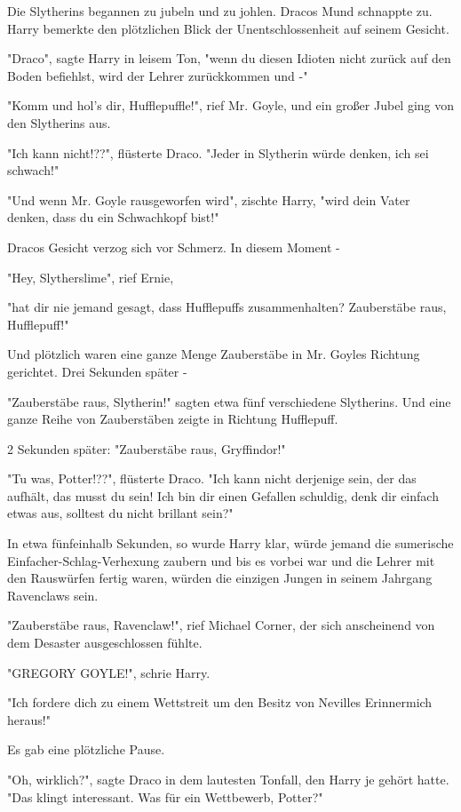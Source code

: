 {Die Slytherins begannen zu jubeln und zu johlen. Dracos Mund schnappte zu. Harry bemerkte den plötzlichen Blick der Unentschlossenheit auf seinem Gesicht.

"Draco", sagte Harry in leisem Ton, "wenn du diesen Idioten nicht zurück auf den Boden befiehlst, wird der Lehrer zurückkommen und -"

"Komm und hol's dir, Hufflepuffle!", rief Mr. Goyle, und ein großer Jubel ging von den Slytherins aus.

"Ich kann nicht!??", flüsterte Draco. "Jeder in Slytherin würde denken, ich sei schwach!"

"Und wenn Mr. Goyle rausgeworfen wird", zischte Harry, "wird dein Vater denken, dass du ein Schwachkopf bist!"

Dracos Gesicht verzog sich vor Schmerz. In diesem Moment -

"Hey, Slytherslime", rief Ernie,

"hat dir nie jemand gesagt, dass Hufflepuffs zusammenhalten? Zauberstäbe raus, Hufflepuff!"

Und plötzlich waren eine ganze Menge Zauberstäbe in Mr. Goyles Richtung gerichtet. Drei Sekunden später -

"Zauberstäbe raus, Slytherin!" sagten etwa fünf verschiedene Slytherins. Und eine ganze Reihe von Zauberstäben zeigte in Richtung Hufflepuff.

2 Sekunden später: "Zauberstäbe raus, Gryffindor!"

"Tu was, Potter!??", flüsterte Draco. "Ich kann nicht derjenige sein, der das aufhält, das musst du sein! Ich bin dir einen Gefallen schuldig, denk dir einfach etwas aus, solltest du nicht brillant sein?"

In etwa fünfeinhalb Sekunden, so wurde Harry klar, würde jemand die sumerische Einfacher-Schlag-Verhexung zaubern und bis es vorbei war und die Lehrer mit den Rauswürfen fertig waren, würden die einzigen Jungen in seinem Jahrgang Ravenclaws sein.

"Zauberstäbe raus, Ravenclaw!", rief Michael Corner, der sich anscheinend von dem Desaster ausgeschlossen fühlte.

"GREGORY GOYLE!", schrie Harry.

"Ich fordere dich zu einem Wettstreit um den Besitz von Nevilles Erinnermich heraus!"

Es gab eine plötzliche Pause.

"Oh, wirklich?", sagte Draco in dem lautesten Tonfall, den Harry je gehört hatte. "Das klingt interessant. Was für ein Wettbewerb, Potter?"

}
